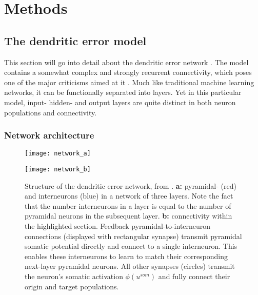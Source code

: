 \chapter{Methods}

\section{The dendritic error model}

This section will go into detail about the dendritic error network \citep{sacramento2018dendritic}. The model contains a
somewhat complex and strongly recurrent connectivity, which poses one of the major criticisms aimed at it
\citep{whittington2019theories}. Much like traditional machine learning networks, it can be functionally separated into
layers. Yet in this particular model, input- hidden- and output layers are quite distinct in both neuron populations and
connectivity.


\subsection{Network architecture}

\begin{figure}[h!]
  \centering
  \begin{minipage}{0.5\textwidth}
    \centering
    \texttt{[image: network\_a]}
  \end{minipage}\hfill
  \begin{minipage}{0.4\textwidth}
    \centering
    \texttt{[image: network\_b]}
  \end{minipage}
  \caption[Structure of the dendritic error network]{Structure of the dendritic error network, from \citep{Haider2021}.
    \textbf{a:} pyramidal- (red) and interneurons (blue) in a network of three layers. Note the fact that the number
    interneurons in a layer is equal to the number of pyramidal neurons in the subsequent layer\protect\footnotemark.
    \textbf{b:} connectivity within the highlighted section. Feedback pyramidal-to-interneuron connections (displayed
    with rectangular synapse) transmit pyramidal somatic potential directly and connect to a single interneuron. This
    enables these interneurons to learn to match their corresponding next-layer pyramidal neurons. All other synapses
    (circles) transmit the neuron's somatic activation $\phi (u^{som})$ and fully connect their origin and target
    populations.}
  \label{fig-network}
\end{figure}

